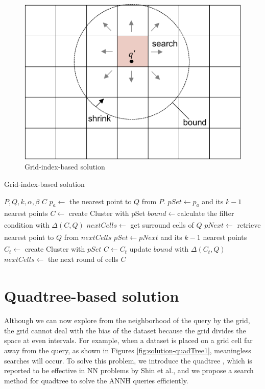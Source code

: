 \documentclass[a4paper,11pt]{report}
\theoremstyle{mytheoremstyle}
\begin{document}
\begin{figure}
\includegraphics[width=\textwidth]{images/solution-grid.pdf}
\caption{Grid-index-based solution} \label{fig:solution-grid}
\end{figure}


\begin{algorithm}                      
\caption{Grid-index-based solution}         
\label{alg:grid}
\begin{algorithmic}[1]                  
\renewcommand{\algorithmicrequire}{\textbf{Input:}}
\renewcommand{\algorithmicensure}{\textbf{Output:}}
\REQUIRE $P,Q,k,\alpha, \beta$
\ENSURE $C$
\STATE $p_a \xleftarrow[]{}$ the nearest point to $Q$ from $P$.
\STATE $pSet \xleftarrow{} p_a$ and its $k-1$ nearest points
\STATE $C \xleftarrow[]{}$ create Cluster with pSet
\STATE $bound \xleftarrow[]{} $calculate the filter condition with $\Delta(C,Q)$
\STATE $nextCells \xleftarrow[]{} $ get surround cells of $Q$
\STATE $pNext \xleftarrow[]{}$ retrieve nearest point to $Q$ from $nextCells$
\STATE $pSet \xleftarrow[]{} pNext$ and its $k-1$ nearest points
\STATE $C_t \xleftarrow{}$ create Cluster with $pSet$
\STATE $C \xleftarrow{} C_t$
\STATE update $bound$ with $\Delta(C_t,Q)$
\ENDIF
\STATE $nextCells \xleftarrow[]{} $ the next round of cells
\ENDWHILE
\RETURN $C$
\end{algorithmic}
\end{algorithm}

\section{Quadtree-based solution}
Although we can now explore from the neighborhood of the query by the grid, the grid cannot deal with the bias of the dataset because the grid divides the space at even intervals. For example, when a dataset is placed on a grid cell far away from the query, as shown in Figures \ref{fig:solution-quadTree1}, meaningless searches will occur. To solve this problem, we introduce the quadtree \cite{finkel1974quad}, which is reported to be effective in NN problems by Shin et al.\cite{shin2019investigation}, and we propose a search method for quadtree to solve the ANNH queries efficiently.
\end{document}
